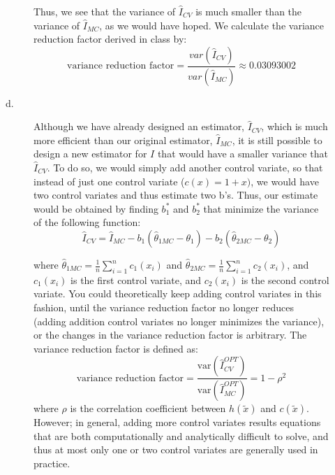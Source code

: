 \documentclass[12pt]{article}
\begin{document}
\begin{description}
\begin{description}
Thus, we see that the variance of $\hat{I}_{CV}$ is much smaller than the variance of $\hat{I}_{MC}$, as we would have hoped.  We calculate the variance reduction factor derived in class by:
\[ \text{variance reduction factor} = \frac{var(\hat{I}_{CV})}{var(\hat{I}_{MC})} \approx 0.03093002\]

\item[d.] Although we have already designed an estimator, $\hat{I}_{CV}$, which is much more efficient than our original estimator, $\hat{I}_{MC}$, it is still possible to design a new estimator for $I$ that would have a smaller variance that $\hat{I}_{CV}$. To do so, we would simply add another control variate, so that instead of just one control variate ($c(x) = 1 + x)$, we would have two control variates and thus estimate two b's. Thus, our estimate would be obtained by finding $b_1^*$ and $b_2^*$ that minimize the variance of the following function:
\[\hat{I}_{CV} = \hat{I}_{MC} - b_1(\hat{\theta}_{1MC} - \theta_1) - b_2(\hat{\theta}_{2MC} - \theta_2)\]

where $\hat{\theta}_{1MC} = \frac{1}{n} \sum_{i = 1}^n c_1(x_i)$ and $\hat{\theta}_{2MC} = \frac{1}{n} \sum_{i = 1}^n c_2(x_i)$, and $c_1(x_i)$ is the first control variate, and $c_2(x_i)$ is the second control variate. You could theoretically keep adding control variates in this fashion, until the variance reduction factor no longer reduces (adding addition control variates no longer minimizes the variance), or the changes in the variance reduction factor is arbitrary. The variance reduction factor is defined as:
\[\text{variance reduction factor} = \frac{\mathrm{var} (\hat{I}_{CV}^{OPT})}{\mathrm{var}(\hat{I}_{MC}^{OPT})} = 1 - \rho^2\]
where $\rho$ is the correlation coefficient between $h(\tilde{x})$ and $c(\tilde{x})$. However; in general, adding more control variates results equations that are both computationally and analytically difficult to solve, and thus at most only one or two control variates are generally used in practice.  
\end{description}




\end{description}
\end{document}
